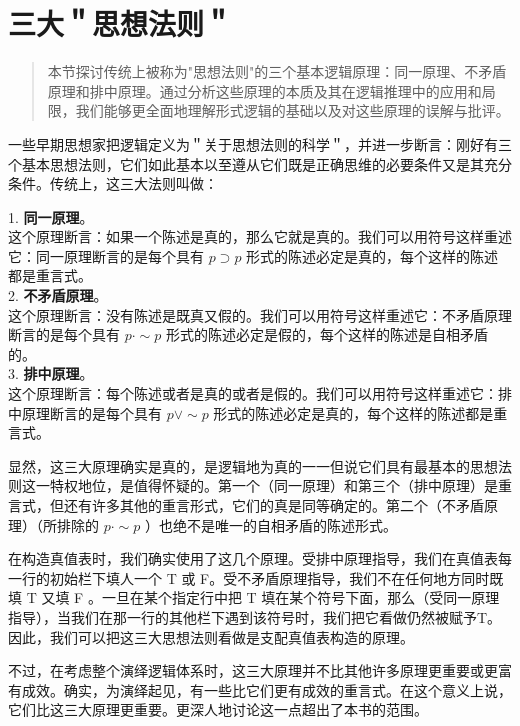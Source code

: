 \section{三大＂思想法则＂}

\begin{quotation}
本节探讨传统上被称为"思想法则"的三个基本逻辑原理：同一原理、不矛盾原理和排中原理。通过分析这些原理的本质及其在逻辑推理中的应用和局限，我们能够更全面地理解形式逻辑的基础以及对这些原理的误解与批评。
\end{quotation}

一些早期思想家把逻辑定义为＂关于思想法则的科学＂，并进一步断言：刚好有三个基本思想法则，它们如此基本以至遵从它们既是正确思维的必要条件又是其充分条件。传统上，这三大法则叫做：

1. \textbf{同一原理}。\\
这个原理断言：如果一个陈述是真的，那么它就是真的。我们可以用符号这样重述它：同一原理断言的是每个具有 $p \supset p$ 形式的陈述必定是真的，每个这样的陈述都是重言式。\\

2. \textbf{不矛盾原理}。\\
这个原理断言：没有陈述是既真又假的。我们可以用符号这样重述它：不矛盾原理断言的是每个具有 $p \cdot \sim p$ 形式的陈述必定是假的，每个这样的陈述是自相矛盾的。\\

3. \textbf{排中原理}。\\
这个原理断言：每个陈述或者是真的或者是假的。我们可以用符号这样重述它：排中原理断言的是每个具有 $p \vee \sim p$ 形式的陈述必定是真的，每个这样的陈述都是重言式。

显然，这三大原理确实是真的，是逻辑地为真的一一但说它们具有最基本的思想法则这一特权地位，是值得怀疑的。第一个（同一原理）和第三个（排中原理）是重言式，但还有许多其他的重言形式，它们的真是同等确定的。第二个（不矛盾原理）（所排除的 $p \cdot \sim p$ ）也绝不是唯一的自相矛盾的陈述形式。

在构造真值表时，我们确实使用了这几个原理。受排中原理指导，我们在真值表每一行的初始栏下填人一个 T 或 F。受不矛盾原理指导，我们不在任何地方同时既填 T 又填 F 。一旦在某个指定行中把 T 填在某个符号下面，那么（受同一原理指导），当我们在那一行的其他栏下遇到该符号时，我们把它看做仍然被赋予T。因此，我们可以把这三大思想法则看做是支配真值表构造的原理。

不过，在考虑整个演绎逻辑体系时，这三大原理并不比其他许多原理更重要或更富有成效。确实，为演绎起见，有一些比它们更有成效的重言式。在这个意义上说，它们比这三大原理更重要。更深人地讨论这一点超出了本书的范围。\cite{hamilton1833}

